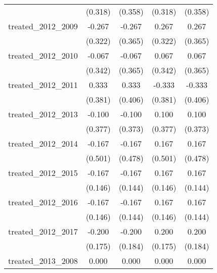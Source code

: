 {\begin{tabular}{l*{4}{c}}
            &     (0.318)         &     (0.358)         &     (0.318)         &     (0.358)         \\
[1em]
treated\_2012\_2009&      -0.267         &      -0.267         &       0.267         &       0.267         \\
            &     (0.322)         &     (0.365)         &     (0.322)         &     (0.365)         \\
[1em]
treated\_2012\_2010&      -0.067         &      -0.067         &       0.067         &       0.067         \\
            &     (0.342)         &     (0.365)         &     (0.342)         &     (0.365)         \\
[1em]
treated\_2012\_2011&       0.333         &       0.333         &      -0.333         &      -0.333         \\
            &     (0.381)         &     (0.406)         &     (0.381)         &     (0.406)         \\
[1em]
treated\_2012\_2013&      -0.100         &      -0.100         &       0.100         &       0.100         \\
            &     (0.377)         &     (0.373)         &     (0.377)         &     (0.373)         \\
[1em]
treated\_2012\_2014&      -0.167         &      -0.167         &       0.167         &       0.167         \\
            &     (0.501)         &     (0.478)         &     (0.501)         &     (0.478)         \\
[1em]
treated\_2012\_2015&      -0.167         &      -0.167         &       0.167         &       0.167         \\
            &     (0.146)         &     (0.144)         &     (0.146)         &     (0.144)         \\
[1em]
treated\_2012\_2016&      -0.167         &      -0.167         &       0.167         &       0.167         \\
            &     (0.146)         &     (0.144)         &     (0.146)         &     (0.144)         \\
[1em]
treated\_2012\_2017&      -0.200         &      -0.200         &       0.200         &       0.200         \\
            &     (0.175)         &     (0.184)         &     (0.175)         &     (0.184)         \\
[1em]
treated\_2013\_2008&       0.000         &       0.000         &       0.000         &       0.000         \\

\end{tabular}}

